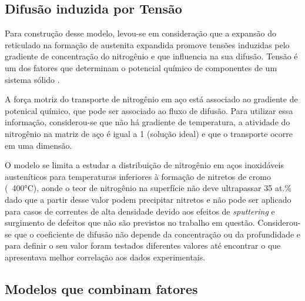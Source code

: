 \documentclass[]{politex}
\begin{document}
\subsection{Difusão induzida por Tensão}
\label{sec:tensao}
	Para construção desse modelo, levou-se em consideração que a expansão do reticulado na formação de austenita expandida promove tensões induzidas pelo gradiente de concentração do nitrogênio e que influencia na sua difusão. Tensão é um dos fatores que determinam o potencial químico de componentes de um sistema sólido \cite{galdikas2010stress}. \par
	 A força motriz do transporte de nitrogênio em aço está associado ao gradiente de potenical químico, que pode ser associado ao fluxo de difusão. Para utilizar essa informação, considerou-se que não há gradiente de temperatura, a atividade do nitrogênio na matriz de aço é igual a 1 (solução ideal) e que o transporte ocorre em uma dimensão. \par
	 O modelo se limita a estudar a distribuição de nitrogênio em aços inoxidáveis austeníticos para temperaturas inferiores à formação de nitretos de cromo (~400°C), aonde o  teor de nitrogênio na superfície não deve ultrapassar 35 at.\% dado que a partir desse valor podem precipitar nitretos e não pode ser aplicado para casos de correntes de alta densidade devido aos efeitos de \textit{sputtering} e surgimento de defeitos que não são previstos no trabalho em questão.
	 Considerou-se que o coeficiente de difusão não depende da concentração ou da profundidade e para definir o seu valor foram testados diferentes valores até encontrar o que apresentava melhor correlação aos dados experimentais.
	 
\subsection{Modelos que combinam fatores}
\end{document}
